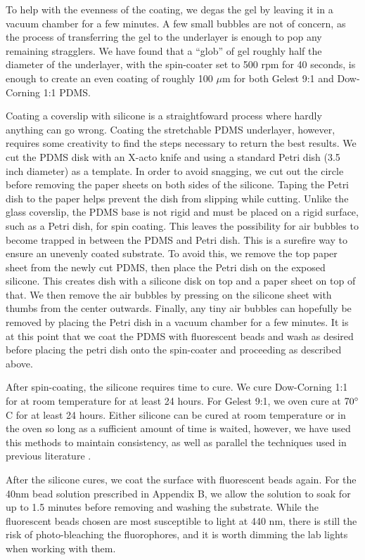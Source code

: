 To help with the evenness of the coating, we degas the gel by leaving it in a vacuum chamber for a few minutes. A few small bubbles are not of concern, as the process of transferring the gel to the underlayer is enough to pop any remaining stragglers. We have found that a ``glob'' of gel roughly half the diameter of the underlayer, with the spin-coater set to 500 rpm for 40 seconds, is enough to create an even coating of roughly 100 $\mu$m for both Gelest 9:1 and Dow-Corning 1:1 PDMS.

Coating a coverslip with silicone is a straightfoward process where hardly anything can go wrong. Coating the stretchable PDMS underlayer, however, requires some creativity to find the steps necessary to return the best results. We cut the PDMS disk with an X-acto knife and using a standard Petri dish (3.5 inch diameter) as a template. In order to avoid snagging, we cut out the circle before removing the paper sheets on both sides of the silicone. Taping the Petri dish to the paper helps prevent the dish from slipping while cutting. Unlike the glass coverslip, the PDMS base is not rigid and must be placed on a rigid surface, such as a Petri dish, for spin coating. This leaves the possibility for air bubbles to become trapped in between the PDMS and Petri dish. This is a surefire way to ensure an unevenly coated substrate. To avoid this, we remove the top paper sheet from the newly cut PDMS, then place the Petri dish on the exposed silicone. This creates dish with a silicone disk on top and a paper sheet on top of that. We then remove the air bubbles by pressing on the silicone sheet with thumbs from the center outwards. Finally, any tiny air bubbles can hopefully be removed by placing the Petri dish in a vacuum chamber for a few minutes. It is at this point that we coat the PDMS with fluorescent beads and wash as desired before placing the petri dish onto the spin-coater and proceeding as described above.

After spin-coating, the silicone requires time to cure. We cure Dow-Corning 1:1 for at room temperature for at least 24 hours. For Gelest 9:1, we oven cure at $70 \degree$ C for at least 24 hours. Either silicone can be cured at room temperature or in the oven so long as a sufficient amount of time is waited, however, we have used this methods to maintain consistency, as well as parallel the techniques used in previous literature \cite{xu2017direct}.

After the silicone cures, we coat the surface with fluorescent beads again. For the 40nm bead solution prescribed in Appendix B, we allow the solution to soak for up to 1.5 minutes before removing and washing the substrate. While the fluorescent beads chosen are most susceptible to light at 440 nm, there is still the risk of photo-bleaching the fluorophores, and it is worth dimming the lab lights when working with them. 

